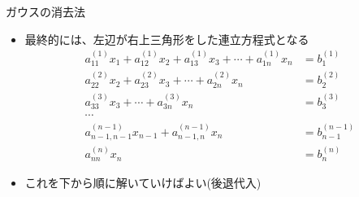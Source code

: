 \begin{frame}[t,fragile]{ガウスの消去法}
  \begin{itemize}
    \setlength{\itemsep}{1em}
  \item 最終的には、左辺が右上三角形をした連立方程式となる
    \begin{align*}
    a_{11}^{(1)} x_1 + a_{12}^{(1)} x_2 + a_{13}^{(1)} x_3 + \cdots + a_{1n}^{(1)} x_n &= b_{1}^{(1)} \\
    a_{22}^{(2)} x_2 + a_{23}^{(2)} x_3 + \cdots + a_{2n}^{(2)} x_n &= b_{2}^{(2)} \\
    a_{33}^{(3)} x_3 + \cdots + a_{3n}^{(3)} x_n &= b_{3}^{(3)} \\
    \cdots \\
    a_{n-1,n-1}^{(n-1)} x_{n-1} + a_{n-1,n}^{(n-1)} x_n &= b_{n-1}^{(n-1)} \\
    a_{nn}^{(n)} x_n &= b_{n}^{(n)}
    \end{align*}
  \item これを下から順に解いていけばよい(後退代入)
  \end{itemize}
\end{frame}
